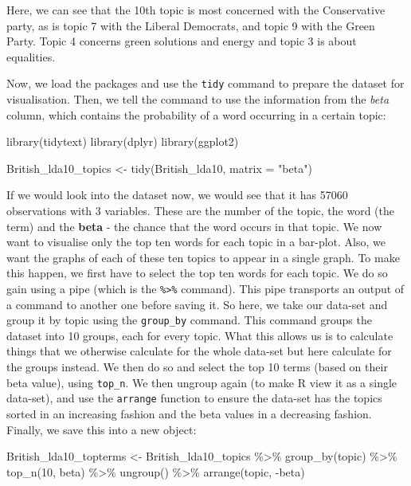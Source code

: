 \documentclass[
]{book}
\newenvironment{Shaded}{\begin{snugshade}}{\end{snugshade}}
\newcommand{\AttributeTok}[1]{\textcolor[rgb]{0.77,0.63,0.00}{#1}}
\newcommand{\DecValTok}[1]{\textcolor[rgb]{0.00,0.00,0.81}{#1}}
\newcommand{\FunctionTok}[1]{\textcolor[rgb]{0.00,0.00,0.00}{#1}}
\newcommand{\NormalTok}[1]{#1}
\newcommand{\OtherTok}[1]{\textcolor[rgb]{0.56,0.35,0.01}{#1}}
\newcommand{\SpecialCharTok}[1]{\textcolor[rgb]{0.00,0.00,0.00}{#1}}
\newcommand{\StringTok}[1]{\textcolor[rgb]{0.31,0.60,0.02}{#1}}
\begin{document}
Here, we can see that the 10th topic is most concerned with the Conservative party, as is topic 7 with the Liberal Democrats, and topic 9 with the Green Party. Topic 4 concerns green solutions and energy and topic 3 is about equalities.

Now, we load the packages and use the \texttt{tidy} command to prepare the dataset for visualisation. Then, we tell the command to use the information from the \emph{beta} column, which contains the probability of a word occurring in a certain topic:

\begin{Shaded}
\begin{Highlighting}[]
\FunctionTok{library}\NormalTok{(tidytext)}
\FunctionTok{library}\NormalTok{(dplyr)}
\FunctionTok{library}\NormalTok{(ggplot2)}

\NormalTok{British\_lda10\_topics }\OtherTok{\textless{}{-}} \FunctionTok{tidy}\NormalTok{(British\_lda10, }\AttributeTok{matrix =} \StringTok{"beta"}\NormalTok{)}
\end{Highlighting}
\end{Shaded}

If we would look into the dataset now, we would see that it has 57060 observations with 3 variables. These are the number of the topic, the word (the term) and the \textbf{beta} - the chance that the word occurs in that topic. We now want to visualise only the top ten words for each topic in a bar-plot. Also, we want the graphs of each of these ten topics to appear in a single graph. To make this happen, we first have to select the top ten words for each topic. We do so gain using a pipe (which is the \texttt{\%\textgreater{}\%} command). This pipe transports an output of a command to another one before saving it. So here, we take our data-set and group it by topic using the \texttt{group\_by} command. This command groups the dataset into 10 groups, each for every topic. What this allows us is to calculate things that we otherwise calculate for the whole data-set but here calculate for the groups instead. We then do so and select the top 10 terms (based on their beta value), using \texttt{top\_n}. We then ungroup again (to make R view it as a single data-set), and use the \texttt{arrange} function to ensure the data-set has the topics sorted in an increasing fashion and the beta values in a decreasing fashion. Finally, we save this into a new object:

\begin{Shaded}
\begin{Highlighting}[]
\NormalTok{British\_lda10\_topterms }\OtherTok{\textless{}{-}}\NormalTok{ British\_lda10\_topics }\SpecialCharTok{\%\textgreater{}\%} \FunctionTok{group\_by}\NormalTok{(topic) }\SpecialCharTok{\%\textgreater{}\%} 
    \FunctionTok{top\_n}\NormalTok{(}\DecValTok{10}\NormalTok{, beta) }\SpecialCharTok{\%\textgreater{}\%} \FunctionTok{ungroup}\NormalTok{() }\SpecialCharTok{\%\textgreater{}\%} \FunctionTok{arrange}\NormalTok{(topic, }\SpecialCharTok{{-}}\NormalTok{beta)}
\end{Highlighting}
\end{Shaded}
\end{document}
